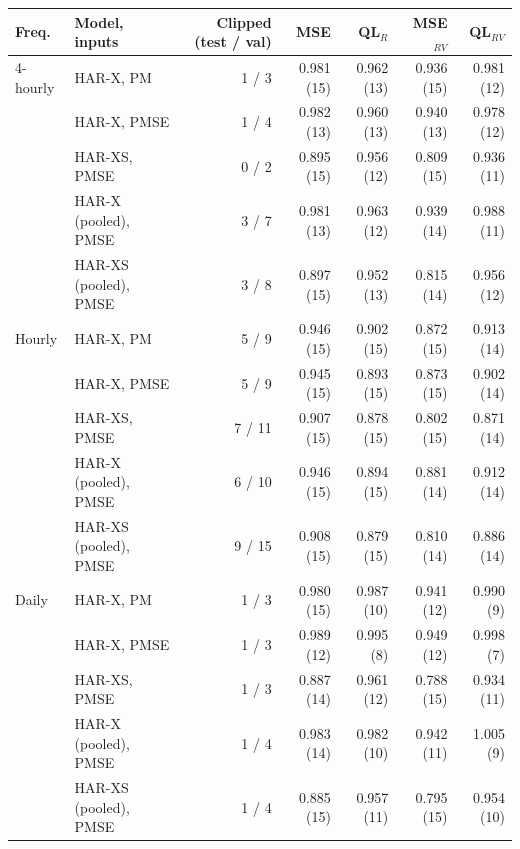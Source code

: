 \begin{tabular}{llrrrrr}
\toprule
Freq. & Model, inputs & Clipped (test / val) & MSE & QL$_R$ & MSE$_{RV}$ & QL$_{RV}$ \\
\midrule
4-hourly & HAR-X, PM & 1 / 3 & 0.981 (15) & 0.962 (13) & 0.936 (15) & 0.981 (12) \\
 & HAR-X, PMSE & 1 / 4 & 0.982 (13) & 0.960 (13) & 0.940 (13) & 0.978 (12) \\
 & HAR-XS, PMSE & 0 / 2 & 0.895 (15) & 0.956 (12) & 0.809 (15) & 0.936 (11) \\
 & HAR-X (pooled), PMSE & 3 / 7 & 0.981 (13) & 0.963 (12) & 0.939 (14) & 0.988 (11) \\
 & HAR-XS (pooled), PMSE & 3 / 8 & 0.897 (15) & 0.952 (13) & 0.815 (14) & 0.956 (12) \\
\midrule
Hourly & HAR-X, PM & 5 / 9 & 0.946 (15) & 0.902 (15) & 0.872 (15) & 0.913 (14) \\
 & HAR-X, PMSE & 5 / 9 & 0.945 (15) & 0.893 (15) & 0.873 (15) & 0.902 (14) \\
 & HAR-XS, PMSE & 7 / 11 & 0.907 (15) & 0.878 (15) & 0.802 (15) & 0.871 (14) \\
 & HAR-X (pooled), PMSE & 6 / 10 & 0.946 (15) & 0.894 (15) & 0.881 (14) & 0.912 (14) \\
 & HAR-XS (pooled), PMSE & 9 / 15 & 0.908 (15) & 0.879 (15) & 0.810 (14) & 0.886 (14) \\
\midrule
Daily & HAR-X, PM & 1 / 3 & 0.980 (15) & 0.987 (10) & 0.941 (12) & 0.990 (9) \\
 & HAR-X, PMSE & 1 / 3 & 0.989 (12) & 0.995 (8) & 0.949 (12) & 0.998 (7) \\
 & HAR-XS, PMSE & 1 / 3 & 0.887 (14) & 0.961 (12) & 0.788 (15) & 0.934 (11) \\
 & HAR-X (pooled), PMSE & 1 / 4 & 0.983 (14) & 0.982 (10) & 0.942 (11) & 1.005 (9) \\
 & HAR-XS (pooled), PMSE & 1 / 4 & 0.885 (15) & 0.957 (11) & 0.795 (15) & 0.954 (10) \\
\bottomrule
\end{tabular}
